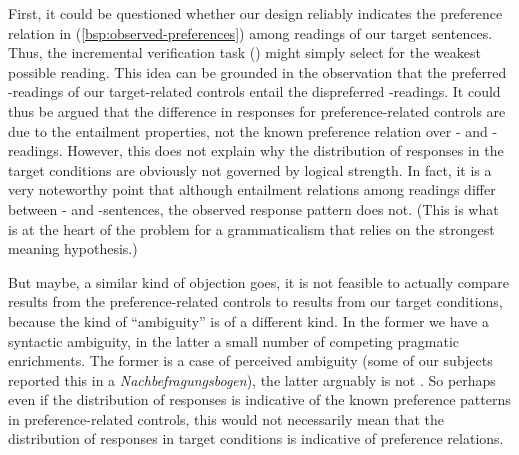 \documentclass[fleqn,reqno,10pt,draft]{article}
\newcommand{\as}{\acro{as}}
\renewcommand{\es}{\acro{es}}
\newcommand{\lc}{\acro{lc}}
\newcommand{\ec}{\acro{ec}}
\newcommand{\ivt}{\acro{ivt}}
\begin{document}
First, it could be questioned whether our design reliably 
indicates the preference relation in (\ref{bsp:observed-preferences}) 
among readings of our target sentences. Thus, the incremental verification task
(\ivt) might simply select for the weakest possible reading. This idea
can be grounded in the observation that the preferred \lc-readings
of our target-related controls entail the dispreferred
\ec-readings. It could thus be argued that the difference in responses
for preference-related controls are due to the entailment properties,
not the known preference relation over \lc- and \ec-readings. However, this
does not explain why the distribution of responses in the target
conditions are obviously not governed by logical strength. In fact, it
is a very noteworthy point that although entailment relations among
readings differ between \as- and \es-sentences, the observed response
pattern does not. (This is what is at the heart of the problem for a
grammaticalism that relies on the strongest meaning hypothesis.)

But maybe, a similar kind of objection goes, it is not feasible to
actually compare results from the preference-related controls to
results from our target conditions, because the kind of ``ambiguity''
is of a different kind. In the former we have a syntactic
ambiguity, in the latter a small number of competing pragmatic
enrichments. The former is a case of perceived ambiguity (some of our
subjects reported this in a \emph{Nachbefragungsbogen}), 
the latter arguably is
not \citep[c.f.][]{GeurtsPouscoulous2009:Embedded-Implic}. So perhaps
even if the distribution of responses is indicative of the known
preference patterns in preference-related controls, this would not
necessarily mean that the distribution of responses in target
conditions is indicative of preference relations.
\end{document}
